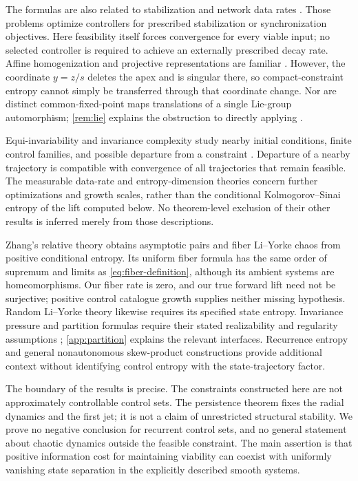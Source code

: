 \documentclass[11pt,a4paper]{article}
\theoremstyle{definition}
\theoremstyle{remark}
\begin{document}
The formulas are also related to stabilization and network data rates \cite{CH2021,KD2016}. Those problems optimize controllers for prescribed stabilization or synchronization objectives. Here feasibility itself forces convergence for every viable input; no selected controller is required to achieve an externally prescribed decay rate. Affine homogenization and projective representations are familiar \cite{CST2023}. However, the coordinate \(y=z/s\) deletes the apex and is singular there, so compact-constraint entropy cannot simply be transferred through that coordinate change. Nor are distinct common-fixed-point maps translations of a single Lie-group automorphism; \cref{rem:lie} explains the obstruction to directly applying \cite{CCS2021}.

Equi-invariability and invariance complexity study nearby initial conditions, finite control families, and possible departure from a constraint \cite{ZCH2021,ZC2023,CZ2024}. Departure of a nearby trajectory is compatible with convergence of all trajectories that remain feasible. The measurable data-rate and entropy-dimension theories \cite{WH2024,ZH2025,CHZ2026} concern further optimizations and growth scales, rather than the conditional Kolmogorov--Sinai entropy of the lift computed below. No theorem-level exclusion of their other results is inferred merely from those descriptions.

Zhang's relative theory \cite[Theorems 3.9, 3.10, and 4.2]{Zhang2006} obtains asymptotic pairs and fiber Li--Yorke chaos from positive conditional entropy. Its uniform fiber formula \cite[Lemma 4.3]{Zhang2006} has the same order of supremum and limits as \eqref{eq:fiber-definition}, although its ambient systems are homeomorphisms. Our fiber rate is zero, and our true forward lift need not be surjective; positive control catalogue growth supplies neither missing hypothesis. Random Li--Yorke theory \cite{LTZ2024} likewise requires its specified state entropy. Invariance pressure and partition formulas require their stated realizability and regularity assumptions \cite{YCYZ2025,ZHZ2023}; \cref{app:partition} explains the relevant interfaces. Recurrence entropy \cite{SM2026} and general nonautonomous skew-product constructions \cite{CF2026} provide additional context without identifying control entropy with the state-trajectory factor.

The boundary of the results is precise. The constraints constructed here are not approximately controllable control sets. The persistence theorem fixes the radial dynamics and the first jet; it is not a claim of unrestricted structural stability. We prove no negative conclusion for recurrent control sets, and no general statement about chaotic dynamics outside the feasible constraint. The main assertion is that positive information cost for maintaining viability can coexist with uniformly vanishing state separation in the explicitly described smooth systems.
\end{document}
